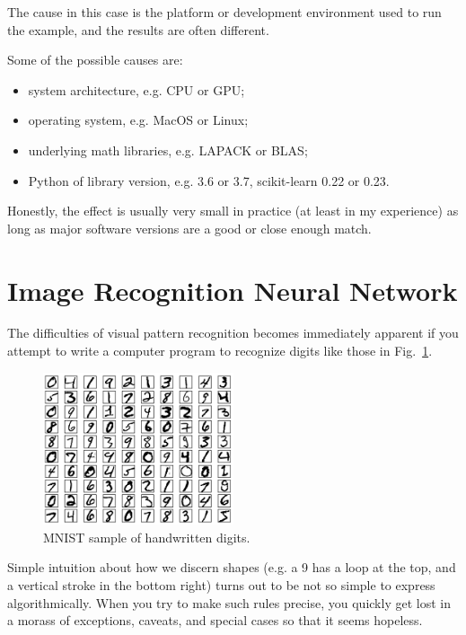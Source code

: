 The cause in this case is the platform or development environment used to run the example, and the results are often different.

Some of the possible causes are:
\begin{itemize}
\tightlist
\item system architecture, e.g. CPU or GPU;
\item operating system, e.g. MacOS or Linux;
\item underlying math libraries, e.g. LAPACK or BLAS;
\item Python of library version, e.g. 3.6 or 3.7, scikit-learn 0.22 or 0.23.
\end{itemize}

Honestly, the effect is usually very small in practice (at least in my experience) as long as major software versions are a good or close enough match.

\section{Image Recognition Neural Network}
\label{neural-net-to-recognize-handwritten-digits}

The difficulties of visual pattern recognition becomes immediately apparent if you attempt to write a computer program to recognize digits like those in Fig.~\ref{fig:mnist}.

\begin{figure}[b]
\centering
\includegraphics[width=0.5\textwidth]{figures/mnist_100_digits}
\caption{MNIST sample of handwritten digits.}
\label{fig:mnist}
\end{figure}

Simple intuition about how we discern shapes (e.g. a 9 has a loop at the top, and a vertical stroke in the bottom right) turns out to be not so simple to express algorithmically. When you try to make such rules precise, you quickly get lost in a morass of exceptions, caveats, and special cases so that it seems hopeless.

